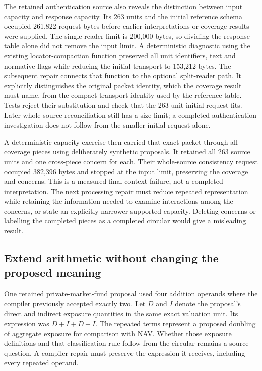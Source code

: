 \documentclass[12pt,a4paper,oneside,openany]{book}
\begin{document}
The retained authentication source also reveals the distinction between input
capacity and response capacity. Its 263 units and the initial reference schema
occupied 261,822 request bytes before earlier interpretations or coverage
results were supplied. The single-reader limit is 200,000 bytes, so dividing
the response table alone did not remove the input limit. A deterministic
diagnostic using the existing locator-compaction function preserved all unit
identifiers, text and normative flags while reducing the initial transport to
153,212 bytes. The subsequent repair connects that function to the optional
split-reader path. It explicitly distinguishes the original packet identity,
which the coverage result must name, from the compact transport identity used
by the reference table. Tests reject their substitution and check that the
263-unit initial request fits. Later whole-source reconciliation still has a
size limit; a completed authentication investigation does not follow from the
smaller initial request alone.

A deterministic capacity exercise then carried that exact packet through all
coverage pieces using deliberately synthetic proposals. It retained all 263
source units and one cross-piece concern for each. Their whole-source
consistency request occupied 382,396 bytes and stopped at the input limit,
preserving the coverage and concerns. This is a measured final-context failure,
not a completed interpretation. The next processing repair must reduce repeated
representation while retaining the information needed to examine interactions
among the concerns, or state an explicitly narrower supported capacity. Deleting
concerns or labelling the completed pieces as a completed circular would give
a misleading result.

\subsection{Extend arithmetic without changing the proposed meaning}

One retained private-market-fund proposal used four addition operands where
the compiler previously accepted exactly two. Let $D$ and $I$ denote the
proposal's direct and indirect exposure quantities in the same exact valuation
unit. Its expression was $D+I+D+I$. The repeated terms represent a proposed
doubling of aggregate exposure for comparison with NAV. Whether those exposure
definitions and that classification rule follow from the circular remains a
source question. A compiler repair must preserve the expression it receives,
including every repeated operand.
\end{document}
